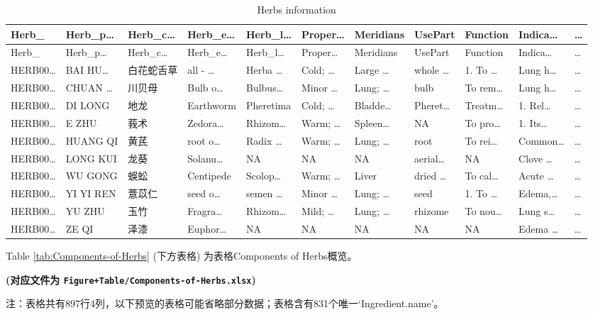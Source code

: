 \documentclass[
]{article}
\begin{document}
\begin{longtable}[]{@{}lllllllllll@{}}
\caption{\label{tab:Herbs-information}Herbs information}\tabularnewline
\toprule
Herb\_ & Herb\_p\ldots{} & Herb\_c\ldots{} & Herb\_e\ldots{} & Herb\_l\ldots{} & Proper\ldots{} & Meridians & UsePart & Function & Indica\ldots{} & \ldots{}\tabularnewline
\midrule
\endfirsthead
\toprule
Herb\_ & Herb\_p\ldots{} & Herb\_c\ldots{} & Herb\_e\ldots{} & Herb\_l\ldots{} & Proper\ldots{} & Meridians & UsePart & Function & Indica\ldots{} & \ldots{}\tabularnewline
\midrule
\endhead
HERB00\ldots{} & BAI HU\ldots{} & 白花蛇舌草 & all - \ldots{} & Herba \ldots{} & Cold; \ldots{} & Large \ldots{} & whole \ldots{} & 1. To \ldots{} & Lung h\ldots{} & \ldots{}\tabularnewline
HERB00\ldots{} & CHUAN \ldots{} & 川贝母 & Bulb o\ldots{} & Bulbus\ldots{} & Minor \ldots{} & Lung; \ldots{} & bulb & To rem\ldots{} & Lung h\ldots{} & \ldots{}\tabularnewline
HERB00\ldots{} & DI LONG & 地龙 & Earthworm & Pheretima & Cold; \ldots{} & Bladde\ldots{} & Pheret\ldots{} & Treatm\ldots{} & 1. Rel\ldots{} & \ldots{}\tabularnewline
HERB00\ldots{} & E ZHU & 莪术 & Zedora\ldots{} & Rhizom\ldots{} & Warm; \ldots{} & Spleen\ldots{} & NA & To pro\ldots{} & 1. Its\ldots{} & \ldots{}\tabularnewline
HERB00\ldots{} & HUANG QI & 黄芪 & root o\ldots{} & Radix \ldots{} & Warm; \ldots{} & Lung; \ldots{} & root & To rei\ldots{} & Common\ldots{} & \ldots{}\tabularnewline
HERB00\ldots{} & LONG KUI & 龙葵 & Solanu\ldots{} & NA & NA & NA & aerial\ldots{} & NA & Clove \ldots{} & \ldots{}\tabularnewline
HERB00\ldots{} & WU GONG & 蜈蚣 & Centipede & Scolop\ldots{} & Warm; \ldots{} & Liver & dried \ldots{} & To cal\ldots{} & Acute \ldots{} & \ldots{}\tabularnewline
HERB00\ldots{} & YI YI REN & 薏苡仁 & seed o\ldots{} & semen \ldots{} & Minor \ldots{} & Lung; \ldots{} & seed & 1. To \ldots{} & Edema,\ldots{} & \ldots{}\tabularnewline
HERB00\ldots{} & YU ZHU & 玉竹 & Fragra\ldots{} & Rhizom\ldots{} & Mild; \ldots{} & Lung; \ldots{} & rhizome & To nou\ldots{} & Lung s\ldots{} & \ldots{}\tabularnewline
HERB00\ldots{} & ZE QI & 泽漆 & Euphor\ldots{} & NA & NA & NA & NA & NA & Edema \ldots{} & \ldots{}\tabularnewline
\bottomrule
\end{longtable}

Table \ref{tab:Components-of-Herbs} (下方表格) 为表格Components of Herbs概览。

\textbf{(对应文件为 \texttt{Figure+Table/Components-of-Herbs.xlsx})}

\begin{center}\begin{tcolorbox}[colback=gray!10, colframe=gray!50, width=0.9\linewidth, arc=1mm, boxrule=0.5pt]注：表格共有897行4列，以下预览的表格可能省略部分数据；表格含有831个唯一`Ingredient.name'。
\end{tcolorbox}
\end{center}
\end{document}
